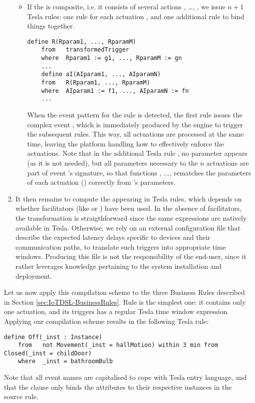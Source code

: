 \begin{enumerate}
\begin{itemize}
		\item If the  is composite, i.e. it consists of several actions , \ldots, , we issue $n+1$ Tesla rules: one rule for each actuation , and one additional rule to bind things together.
		\begin{center}
			\begin{lstlisting}[language=tesla, numbers=none]
	define R(Rparam1, ..., RparamM)
	from   transformedTrigger
	where  Rparam1 := g1, ..., RparamM := gn
	...
	define aI(AIparam1, ..., AIparamN)
	from   R(Rparam1, ..., RparamM)
	where  AIparam1 := f1, ..., AIparamN := fn
	...
			\end{lstlisting}
		\end{center}
		When the event pattern for the rule  is detected, the first rule issues the complex event , which is immediately produced by the \CEP engine to trigger the subsequent rules. This way, all actuations are processed at the same time, leaving the platform handling how to effectively enforce the actuations. Note that in the additional Tesla rule , no  parameter appears (as it is not needed), but all parameters necessary to the $n$ actuations are part of event 's signature, so that functions , ...,  rematches the parameters of each actuation () correctly from 's parameters.
	\end{itemize}
	\item It then remains to compute the  appearing in Tesla rules, which depends on whether facilitators (like  or ) have been used. In the absence of facilitators, the transformation is straigthforward since the same expressions are natively available in Tesla. Otherwise, we rely on an external configuration file that describe the expected latency delays specific to devices and their communication paths, to translate such triggers into appropriate time windows. Producing this file is not the responsibility of the end-user, since it rather leverages knowledge pertaining to the \IOT system installation and deployment. 
\end{enumerate}

Let us now apply this compilation scheme to the three Business Rules described in Section \ref{sec:IoTDSL-BusinessRules}. Rule  is the simplest one: it contains only one actuation, and its triggers has a regular Tesla time window expression. Applying our compilation scheme results in the following Tesla rule:
\begin{lstlisting}[language=tesla, numbers=none]
	define Off(_inst : Instance)
	from   not Movement(_inst = hallMotion) within 3 min from Closed(_inst = childDoor)
	where  _inst = bathroomBulb
\end{lstlisting}
Note that all event names are capitalised to cope with Tesla entry language, and that the  clause only binds the  attributes to their respective instances in the source \IOTDSL rule. 

